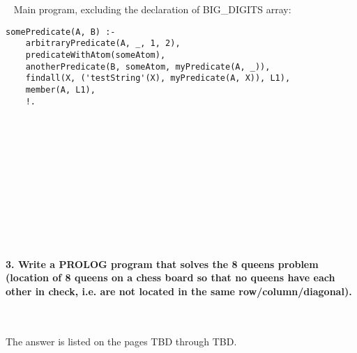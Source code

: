 \documentclass{article}
\begin{document}
	\rmfamily\
	\newline
	\noindent Main program, excluding the declaration of BIG_DIGITS array:
	
	\begin{verbatim}
somePredicate(A, B) :-
    arbitraryPredicate(A, _, 1, 2),
    predicateWithAtom(someAtom),
    anotherPredicate(B, someAtom, myPredicate(A, _)),
    findall(X, ('testString'(X), myPredicate(A, X)), L1),
    member(A, L1),
    !.
	\end{verbatim}
	

	
\paragraph{}\
\paragraph{}\
\paragraph{}\
\paragraph{}\
\paragraph{}\


	
	\rmfamily
	
	\paragraph{3. Write a PROLOG program that solves the 8 queens problem (location of 8 queens on a chess board so that no queens have each other in check, i.e. are not located in the same row/column/diagonal). }\
	\newline
	\rmfamily\
	
	The answer is listed on the pages TBD through TBD.
	
	

		
\end{document}
